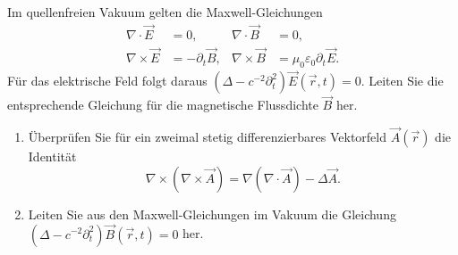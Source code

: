 \begin{ExerciseBlock}
Im quellenfreien Vakuum gelten die Maxwell-Gleichungen
\[
\begin{aligned}
 \nabla\cdot\vec E&=0, & \nabla\cdot\vec B&=0,\\
 \nabla\times\vec E&=-\partial_t\vec B, &
 \nabla\times\vec B&=\mu_0\varepsilon_0\partial_t\vec E.
\end{aligned}
\]
Für das elektrische Feld folgt daraus $(\Delta-c^{-2}\partial_t^2)\vec E(\vec r,t)=0$. Leiten Sie die entsprechende Gleichung für die magnetische Flussdichte $\vec B$ her.
\begin{enumerate}
\item Überprüfen Sie für ein zweimal stetig differenzierbares Vektorfeld $\vec A(\vec r)$ die Identität
\[
 \nabla\times(\nabla\times\vec A)=\nabla(\nabla\cdot\vec A)-\Delta\vec A.
\]
\item Leiten Sie aus den Maxwell-Gleichungen im Vakuum die Gleichung $(\Delta-c^{-2}\partial_t^2)\vec B(\vec r,t)=0$ her.
\end{enumerate}
\end{ExerciseBlock}
